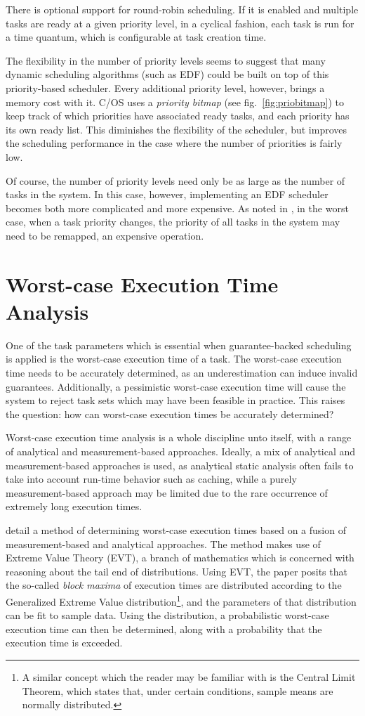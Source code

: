 \documentclass[twoside]{uva-inf-bachelor-thesis}
\newcommand{\ucos}{\textmu C/OS\xspace}
\begin{document}
There is optional support for round-robin scheduling. If it is enabled and multiple tasks are ready at a given priority level, in a cyclical fashion, each task is run for a time quantum, which is configurable at task creation time.

The flexibility in the number of priority levels seems to suggest that many dynamic scheduling algorithms (such as EDF) could be built on top of this priority-based scheduler. Every additional priority level, however, brings a memory cost with it. \ucos uses a \textit{priority bitmap} (see fig.~\ref{fig:priobitmap}) to keep track of which priorities have associated ready tasks, and each priority has its own ready list. This diminishes the flexibility of the scheduler, but improves the scheduling performance in the case where the number of priorities is fairly low.

Of course, the number of priority levels need only be as large as the number of tasks in the system. In this case, however, implementing an EDF scheduler becomes both more complicated and more expensive. As noted in \textcite[\S 2]{Buttazzo2005}, in the worst case, when a task priority changes, the priority of all tasks in the system may need to be remapped, an expensive operation.

\section{Worst-case Execution Time Analysis}
One of the task parameters which is essential when guarantee-backed scheduling is applied is the worst-case execution time of a task. The worst-case execution time needs to be accurately determined, as an underestimation can induce invalid guarantees. Additionally, a pessimistic worst-case execution time will cause the system to reject task sets which may have been feasible in practice. This raises the question: how can worst-case execution times be accurately determined?

Worst-case execution time analysis is a whole discipline unto itself, with a range of analytical and measurement-based approaches. Ideally, a mix of analytical and measurement-based approaches is used, as analytical static analysis often fails to take into account run-time behavior such as caching, while a purely measurement-based approach may be limited due to the rare occurrence of extremely long execution times.

\textcite{hansen_et_al:wcet} detail a method of determining worst-case execution times based on a fusion of measurement-based and analytical approaches. The method makes use of Extreme Value Theory (EVT), a branch of mathematics which is concerned with reasoning about the tail end of distributions. Using EVT, the paper posits that the so-called \emph{block maxima} of execution times are distributed according to the Generalized Extreme Value distribution\footnote{A similar concept which the reader may be familiar with is the Central Limit Theorem, which states that, under certain conditions, sample means are normally distributed.}, and the parameters of that distribution can be fit to sample data. Using the distribution, a probabilistic worst-case execution time can then be determined, along with a probability that the execution time is exceeded.
\end{document}
